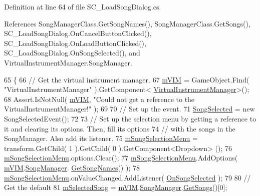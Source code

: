 Definition at line 64 of file S\+C\+\_\+\+Load\+Song\+Dialog.\+cs.



References Song\+Manager\+Class.\+Get\+Song\+Names(), Song\+Manager\+Class.\+Get\+Songs(), S\+C\+\_\+\+Load\+Song\+Dialog.\+On\+Cancel\+Button\+Clicked(), S\+C\+\_\+\+Load\+Song\+Dialog.\+On\+Load\+Button\+Clicked(), S\+C\+\_\+\+Load\+Song\+Dialog.\+On\+Song\+Selected(), and Virtual\+Instrument\+Manager.\+Song\+Manager.


\begin{DoxyCode}
65     \{
66         \textcolor{comment}{// Get the virtual instrument manager.}
67         \hyperlink{group___s_c___l_s_d_priv_var_ga6ffbaa999c431dd52e57c242b1b33b49}{mVIM} = GameObject.Find( \textcolor{stringliteral}{"VirtualInstrumentManager"} ).GetComponent<
      \hyperlink{class_virtual_instrument_manager}{VirtualInstrumentManager}>();
68         Assert.IsNotNull( \hyperlink{group___s_c___l_s_d_priv_var_ga6ffbaa999c431dd52e57c242b1b33b49}{mVIM}, \textcolor{stringliteral}{"Could not get a reference to the VirtualInstrumentManager!"} );
69 
70         \textcolor{comment}{// Set up the event.}
71         \hyperlink{group___s_c___l_s_d_events_ga48d606b2c8291fee822dcc2b14ddcecc}{SongSelected} = \textcolor{keyword}{new} SongSelectedEvent();
72 
73         \textcolor{comment}{// Set up the selection menu by getting a reference to it and clearing its options. Then, fill its
       options}
74         \textcolor{comment}{// with the songs in the SongManager. Also add its listener.}
75         \hyperlink{group___s_c___l_s_d_priv_var_ga93543d4b5bf0c2127cb5489112cc29be}{mSongSelectionMenu} = transform.GetChild( 1 ).GetChild( 0 ).GetComponent<Dropdown>
      ();
76         \hyperlink{group___s_c___l_s_d_priv_var_ga93543d4b5bf0c2127cb5489112cc29be}{mSongSelectionMenu}.options.Clear();
77         \hyperlink{group___s_c___l_s_d_priv_var_ga93543d4b5bf0c2127cb5489112cc29be}{mSongSelectionMenu}.AddOptions( \hyperlink{group___s_c___l_s_d_priv_var_ga6ffbaa999c431dd52e57c242b1b33b49}{mVIM}.\hyperlink{group___v_i_m_pub_ga33dae94932c10c66db76a0eebec76b01}{SongManager}.
      \hyperlink{group___s_m_pub_func_ga2a9455a763e35cfb6b242a82f7d797ae}{GetSongNames}() );
78         \hyperlink{group___s_c___l_s_d_priv_var_ga93543d4b5bf0c2127cb5489112cc29be}{mSongSelectionMenu}.onValueChanged.AddListener( 
      \hyperlink{group___s_c___l_s_d_handlers_gacbe31698637339188fd50ba1a6723eab}{OnSongSelected} );
79 
80         \textcolor{comment}{// Get the default }
81         \hyperlink{group___s_c___l_s_d_priv_var_ga007db4c9493497f21fb518ab676226a4}{mSelectedSong} = \hyperlink{group___s_c___l_s_d_priv_var_ga6ffbaa999c431dd52e57c242b1b33b49}{mVIM}.\hyperlink{group___v_i_m_pub_ga33dae94932c10c66db76a0eebec76b01}{SongManager}.\hyperlink{group___s_m_pub_func_ga3bf6a6d42a7c5e94cc85ba10eb9e6edb}{GetSongs}()[0];

\end{DoxyCode}
